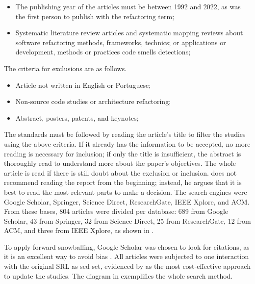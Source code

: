 \begin{itemize}
    \item The publishing year of the articles must be between 1992 and 2022, as \textcite{Opdyke1992} was the first person to publish with the refactoring term;
    \item Systematic literature review articles and systematic mapping reviews about software refactoring methods, frameworks, technics; or applications or development, methods or practices code smells detections;
\end{itemize}

The criteria for exclusions are as follows.

\begin{itemize}
    \item Article not written in English or Portuguese;
    \item Non-source code studies or architecture refactoring;
    \item Abstract, posters, patents, and keynotes;
\end{itemize}

The standards must be followed by reading the article's title to filter the studies using the above criteria. If it already has the information to be accepted, no more reading is necessary for inclusion; if only the title is insufficient, the abstract is thoroughly read to understand more about the paper's objectives. The whole article is read if there is still doubt about the exclusion or inclusion. \textcite{Wohlin2014} does not recommend reading the report from the beginning; instead, he argues that it is best to read the most relevant parts to make a decision.
The search engines were Google Scholar, Springer, Science Direct, ResearchGate, IEEE Xplore, and ACM. From these bases, 804 articles were divided per database: 689 from Google Scholar, 43 from Springer, 32 from Science Direct, 25 from ResearchGate, 12 from ACM, and three from IEEE Xplore, as shown in .

To apply forward snowballing, Google Scholar was chosen to look for citations, as it is an excellent way to avoid bias \cite{Wohlin2014}. All articles were subjected to one interaction with the original SRL as sed set, evidenced by \textcite{Wohlin2020} as the most cost-effective approach to update the studies. The diagram in  exemplifies the whole search method. 

